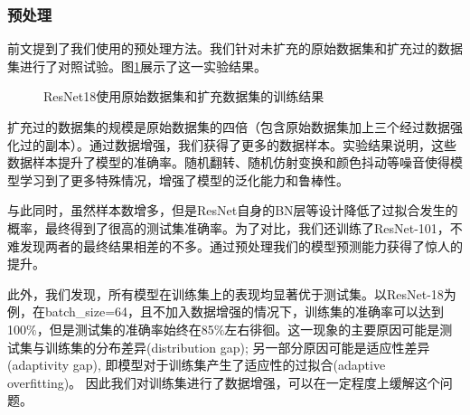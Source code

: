 \documentclass[hyperref, UTF8, 12pt]{article}
\theoremstyle{definition}
\begin{document}
\subsubsection{预处理}
前文提到了我们使用的预处理方法。我们针对未扩充的原始数据集和扩充过的数据集进行了对照试验。图\ref{fig:resnet18_amp}展示了这一实验结果。
\begin{figure}[H]
	\centering
	\caption{ResNet18使用原始数据集和扩充数据集的训练结果}
	\label{fig:resnet18_amp}
\end{figure}
扩充过的数据集的规模是原始数据集的四倍（包含原始数据集加上三个经过数据强化过的副本）。通过数据增强，我们获得了更多的数据样本。实验结果说明，这些数据样本提升了模型的准确率。随机翻转、随机仿射变换和颜色抖动等噪音使得模型学习到了更多特殊情况，增强了模型的泛化能力和鲁棒性。

与此同时，虽然样本数增多，但是ResNet自身的BN层等设计降低了过拟合发生的概率，最终得到了很高的测试集准确率。为了对比，我们还训练了ResNet-101，不难发现两者的最终结果相差的不多。通过预处理我们的模型预测能力获得了惊人的提升。

此外，我们发现，所有模型在训练集上的表现均显著优于测试集。以ResNet-18为例，在batch\_size=64，且不加入数据增强的情况下，训练集的准确率可以达到100$\%$，但是测试集的准确率始终在85$\%$左右徘徊。这一现象的主要原因可能是测试集与训练集的分布差异(distribution gap); 另一部分原因可能是适应性差异(adaptivity gap), 即模型对于训练集产生了适应性的过拟合(adaptive overfitting)。\cite{cifar2018} 因此我们对训练集进行了数据增强，可以在一定程度上缓解这个问题。
\end{document}
